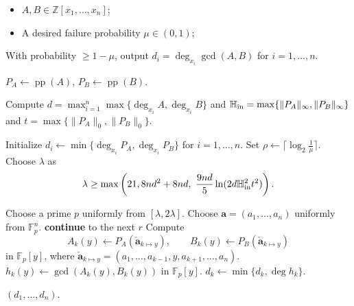 \documentclass{article}
\numberwithin{equation}{section}
\begin{document}
\begin{algorithm}
\caption{Computing Partial Degrees of the Integer GCD}
\label{alg:int-degree-match}
\begin{algorithmic}[1]
\Require
    \begin{itemize}
        \item $A, B \in \mathbb{Z}[x_1,\dots,x_n]$;
        \item A desired failure probability $\mu\in(0,1)$;
    \end{itemize}
\Ensure
    With probability $\ge 1-\mu$, output $d_i = \deg_{x_i} \gcd(A,B)$ for $i=1,\dots,n$.


\State $P_A \gets \operatorname{pp}(A)$, $P_B \gets \operatorname{pp}(B)$.

\State  Compute $d=\max_{i=1}^n\max\{\deg_{x_i}A,\deg_{x_i}B\}$ and $\mathbb{H}_{\rm in} = \max\{\|P_A\|_\infty, \|P_B\|_\infty\}$ and $t=\max\{\|P_A\|_0,\|P_B\|_0\}$.

\State Initialize $d_i \gets \min\{\deg_{x_i} P_A, \deg_{x_i} P_B\}$ for $i=1,\dots,n$.
\State Set $\rho \gets \lceil \log_2\frac{1}{\mu} \rceil$.
\State Choose $\lambda$ as \[
\lambda \ge \max\left(21,8nd^2 + 8nd,\ \frac{9nd}{5}\ln(2d \Hi^2 t^2)\right).
\]


    \State Choose a prime $p$ uniformly from $[\lambda, 2\lambda]$.
    \State Choose $\mathbf{a} = (a_1,\dots,a_n)$ uniformly from $\mathbb{F}_p^n$.
            \State \textbf{continue} to the next $r$
        \EndIf
        \State Compute
        \[
        A_k(y) \gets P_A(\mathbf{\check{a}}_{k \mapsto y} ), \qquad B_k(y) \gets P_B(\mathbf{\check{a}}_{k \mapsto y} )
        \]
        in $\mathbb{F}_p[y]$, where $\mathbf{\check{a}}_{k \mapsto y}  = (a_1,\dots,a_{k-1}, y, a_{k+1},\dots,a_n)$.
        \State $h_k(y) \gets \gcd(A_k(y), B_k(y))$ in $\mathbb{F}_p[y]$.
        \State $d_k \gets \min\{d_k, \deg h_k\}$.
    \EndFor
\EndFor

\State \Return $(d_1, \dots, d_n)$.
\end{algorithmic}
\end{algorithm}
\end{document}

